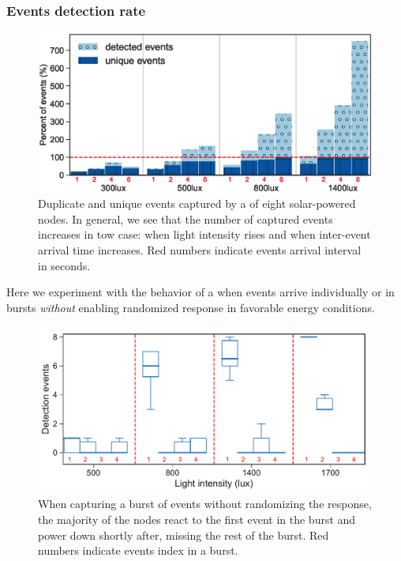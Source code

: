 \subsubsection{Events detection rate}
%
\begin{figure}[t!]
		\centering
	    \includegraphics[width=\columnwidth]{figures/regular_events_capture_rate.eps}
		\caption{Duplicate and unique events captured by a \fullcim of eight solar-powered nodes. In general, we see that the number of captured events increases in tow case: when light intensity rises and when inter-event arrival time increases. 
         Red numbers indicate events arrival interval in seconds.
         }
    	\label{fig:events_detection_rate}
\end{figure} 
Here we experiment with the behavior of a \sys when events arrive individually or in bursts \emph{without} enabling  randomized response in favorable energy conditions. 
%
\begin{figure}[t]
    \includegraphics[width=\columnwidth]{figures/events_burst_problem}
	\caption{When capturing a burst of events without randomizing the response, the majority of the nodes react to the first event in the burst and power down shortly after, missing the rest of the burst. Red numbers indicate events index in a burst.}
    \label{fig:events_burst_problem}
\end{figure}
%
